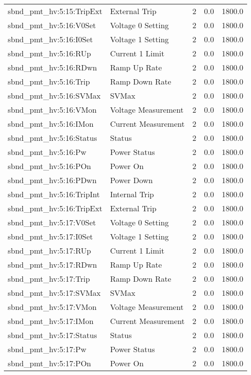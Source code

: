 \begin{center}
\begin{longtable}{l | l l l l }
sbnd\_pmt\_hv:5:15:TripExt & External Trip & 2 & 0.0 & 1800.0\\ 
sbnd\_pmt\_hv:5:16:V0Set & Voltage 0 Setting & 2 & 0.0 & 1800.0\\ 
sbnd\_pmt\_hv:5:16:I0Set & Voltage 1 Setting & 2 & 0.0 & 1800.0\\ 
sbnd\_pmt\_hv:5:16:RUp & Current 1 Limit & 2 & 0.0 & 1800.0\\ 
sbnd\_pmt\_hv:5:16:RDwn & Ramp Up Rate & 2 & 0.0 & 1800.0\\ 
sbnd\_pmt\_hv:5:16:Trip & Ramp Down Rate & 2 & 0.0 & 1800.0\\ 
sbnd\_pmt\_hv:5:16:SVMax & SVMax & 2 & 0.0 & 1800.0\\ 
sbnd\_pmt\_hv:5:16:VMon & Voltage Measurement & 2 & 0.0 & 1800.0\\ 
sbnd\_pmt\_hv:5:16:IMon & Current Measurement & 2 & 0.0 & 1800.0\\ 
sbnd\_pmt\_hv:5:16:Status & Status & 2 & 0.0 & 1800.0\\ 
sbnd\_pmt\_hv:5:16:Pw & Power Status & 2 & 0.0 & 1800.0\\ 
sbnd\_pmt\_hv:5:16:POn & Power On & 2 & 0.0 & 1800.0\\ 
sbnd\_pmt\_hv:5:16:PDwn & Power Down & 2 & 0.0 & 1800.0\\ 
sbnd\_pmt\_hv:5:16:TripInt & Internal Trip & 2 & 0.0 & 1800.0\\ 
sbnd\_pmt\_hv:5:16:TripExt & External Trip & 2 & 0.0 & 1800.0\\ 
sbnd\_pmt\_hv:5:17:V0Set & Voltage 0 Setting & 2 & 0.0 & 1800.0\\ 
sbnd\_pmt\_hv:5:17:I0Set & Voltage 1 Setting & 2 & 0.0 & 1800.0\\ 
sbnd\_pmt\_hv:5:17:RUp & Current 1 Limit & 2 & 0.0 & 1800.0\\ 
sbnd\_pmt\_hv:5:17:RDwn & Ramp Up Rate & 2 & 0.0 & 1800.0\\ 
sbnd\_pmt\_hv:5:17:Trip & Ramp Down Rate & 2 & 0.0 & 1800.0\\ 
sbnd\_pmt\_hv:5:17:SVMax & SVMax & 2 & 0.0 & 1800.0\\ 
sbnd\_pmt\_hv:5:17:VMon & Voltage Measurement & 2 & 0.0 & 1800.0\\ 
sbnd\_pmt\_hv:5:17:IMon & Current Measurement & 2 & 0.0 & 1800.0\\ 
sbnd\_pmt\_hv:5:17:Status & Status & 2 & 0.0 & 1800.0\\ 
sbnd\_pmt\_hv:5:17:Pw & Power Status & 2 & 0.0 & 1800.0\\ 
sbnd\_pmt\_hv:5:17:POn & Power On & 2 & 0.0 & 1800.0\\ 

\end{longtable}
\end{center}
